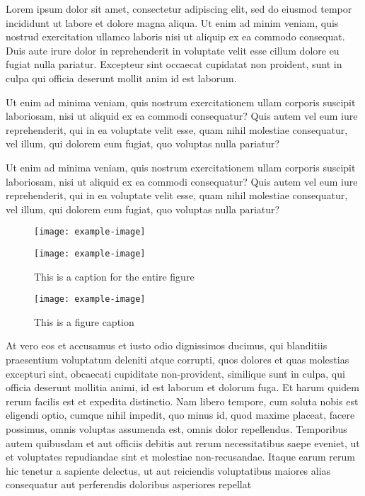 \documentclass{cup-pan}
\begin{document}
Lorem ipsum dolor sit amet, consectetur adipiscing elit, sed do
eiusmod tempor incididunt ut labore et dolore magna aliqua. Ut enim ad
minim veniam, quis nostrud exercitation ullamco laboris nisi ut
aliquip ex ea commodo consequat. Duis aute irure dolor in
reprehenderit in voluptate velit esse cillum dolore eu fugiat nulla
pariatur. Excepteur sint occaecat cupidatat non proident, sunt in
culpa qui officia deserunt mollit anim id est laborum.

Ut enim ad minima veniam, quis nostrum exercitationem ullam corporis
suscipit laboriosam, nisi ut aliquid ex ea commodi consequatur? Quis
autem vel eum iure reprehenderit, qui in ea voluptate velit esse, quam
nihil molestiae consequatur, vel illum, qui dolorem eum fugiat, quo
voluptas nulla pariatur?


Ut enim ad minima veniam, quis nostrum exercitationem ullam corporis
suscipit laboriosam, nisi ut aliquid ex ea commodi consequatur? Quis
autem vel eum iure reprehenderit, qui in ea voluptate velit esse, quam
nihil molestiae consequatur, vel illum, qui dolorem eum fugiat, quo
voluptas nulla pariatur?


\begin{figure}
\begin{minipage}{0.47\textwidth}
\texttt{[image: example-image]}
\end{minipage}
\hfill
\begin{minipage}{0.47\textwidth}
\texttt{[image: example-image]}
\end{minipage}

\caption{This is a caption for the entire figure}
\label{fig:twosubs}
\end{figure}

\begin{sidewaysfigure}
\centering
\texttt{[image: example-image]}
\caption{This is a figure caption}
\label{fig:landscape}
\end{sidewaysfigure}

At vero eos et accusamus et iusto odio dignissimos ducimus, qui
blanditiis praesentium voluptatum deleniti atque corrupti, quos
dolores et quas molestias excepturi sint, obcaecati cupiditate
non-provident, similique sunt in culpa, qui officia deserunt mollitia
animi, id est laborum et dolorum fuga. Et harum quidem rerum facilis
est et expedita distinctio. Nam libero tempore, cum soluta nobis est
eligendi optio, cumque nihil impedit, quo minus id, quod maxime
placeat, facere possimus, omnis voluptas assumenda est, omnis dolor
repellendus. Temporibus autem quibusdam et aut officiis debitis aut
rerum necessitatibus saepe eveniet, ut et voluptates repudiandae sint
et molestiae non-recusandae. Itaque earum rerum hic tenetur a sapiente
delectus, ut aut reiciendis voluptatibus maiores alias consequatur aut
perferendis doloribus asperiores repellat
\end{document}

